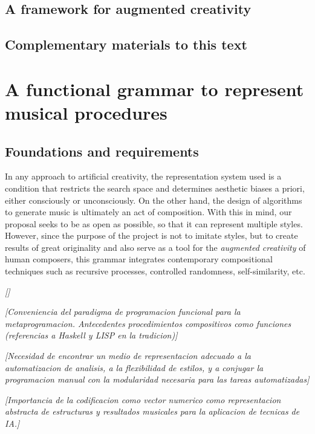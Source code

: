 \documentclass{article}
\begin{document}
\subsection{A framework for augmented creativity}

\subsection{Complementary materials to this text}





\section{A functional grammar to represent musical procedures}

\subsection{Foundations and requirements}

In any approach to artificial creativity, the representation system used is a condition that restricts the search space and determines aesthetic biases a priori, either consciously or unconsciously. On the other hand, the design of algorithms to generate music is ultimately an act of composition. With this in mind, our proposal seeks to be as open as possible, so that it can represent multiple styles. However, since the purpose of the project is not to imitate styles, but to create results of great originality and also serve as a tool for the \emph{augmented creativity} of human composers, this grammar integrates contemporary compositional techniques such as recursive processes, controlled randomness, self-similarity, etc.

{\color{gray} \textsl{[]}}

{\color{gray} \textsl{[Conveniencia del paradigma de programacion funcional para la metaprogramacion. Antecedentes procedimientos compositivos como funciones (referencias a Haskell y LISP en la tradicion)]}}

{\color{gray} \textsl{[Necesidad de encontrar un medio de representacion adecuado a la automatizacion de analisis, a la flexibilidad de estilos, y a conjugar la programacion manual con la modularidad necesaria para las tareas automatizadas]}}

{\color{gray} \textsl{[Importancia de la codificacion como vector numerico como representacion abstracta de estructuras y resultados musicales para la aplicacion de tecnicas de IA.]}}
\end{document}
